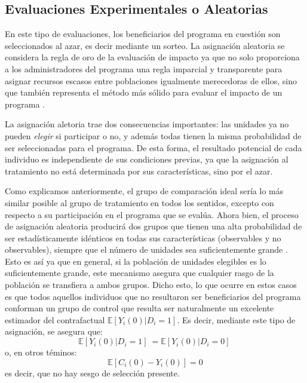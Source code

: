\documentclass[../../main.tex]{subfiles}
\begin{document}
\subsection{Evaluaciones Experimentales o Aleatorias}
En este tipo de evaluaciones, los beneficiarios del programa en cuestión son seleccionados al azar, es decir mediante un sorteo. La asignación aleatoria se considera la regla de oro de la evaluación de impacto ya que no solo proporciona a los administradores del programa una regla imparcial y transparente para asignar recursos escasos entre poblaciones igualmente merecedoras de ellos, sino que también representa el método más sólido para evaluar el impacto de un programa \cite{gertler-2016}.

La asignación aletoria trae dos consecuencias importantes: las unidades ya no pueden \textit{elegir} si participar o no, y además todas tienen la misma probabilidad de ser seleccionadas para el programa. De esta forma, el resultado potencial de cada individuo es independiente de sus condiciones previas, ya que la asignación al tratamiento no está determinada por sus características, sino por el azar.

Como explicamos anteriormente, el grupo de comparación ideal sería lo más similar posible al grupo de tratamiento en todos los sentidos, excepto con respecto a su participación en el programa que se evalúa. Ahora bien, el proceso de asignación aleatoria producirá dos grupos que tienen una alta probabilidad de ser estadísticamente idénticos en todas sus características (observables y no observables), siempre que el número de unidades sea suficientemente grande \cite{gertler-2016}. Esto es así ya que en general, si la población de unidades elegibles es lo suficientemente grande, este mecanismo asegura que cualquier rasgo de la población se transfiera a ambos grupos. Dicho esto, lo que ocurre en estos casos es que todos aquellos individuos que no resultaron ser beneficiarios del programa conforman un grupo de control que resulta ser naturalmente un excelente estimador del contrafactual \(\mathbb{E} \left[Y_i(0)|D_i=1\right]\). Es decir, mediante este tipo de asignación, se asegura que:
\begin{equation}
    \mathbb{E} \left[Y_i(0)|D_i=1\right]\ = \mathbb{E} \left[Y_i(0)|D_i=0\right]\
    \label{eq:asig_aleatoria1}
\end{equation}
o, en otros téminos:
\begin{equation}
    \mathbb{E} \left[C_i(0)-Y_i(0)\right] = 0
    \label{eq:asig_aleatoria2}
\end{equation}
es decir, que no hay sesgo de selección presente.
\end{document}
